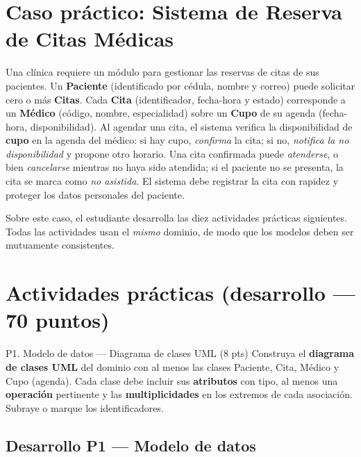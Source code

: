 \documentclass[11pt,a4paper,oneside]{article}
\begin{document}
\section{Caso pr\'actico: Sistema de Reserva de Citas M\'edicas}

Una cl\'inica requiere un m\'odulo para gestionar las reservas de citas de sus pacientes. Un \textbf{Paciente} (identificado por c\'edula, nombre y correo) puede solicitar cero o m\'as \textbf{Citas}. Cada \textbf{Cita} (identificador, fecha-hora y estado) corresponde a un \textbf{M\'edico} (c\'odigo, nombre, especialidad) sobre un \textbf{Cupo} de su agenda (fecha-hora, disponibilidad). Al agendar una cita, el sistema verifica la disponibilidad de \textbf{cupo} en la agenda del m\'edico: si hay cupo, \emph{confirma} la cita; si no, \emph{notifica la no disponibilidad} y propone otro horario. Una cita confirmada puede \emph{atenderse}, o bien \emph{cancelarse} mientras no haya sido atendida; si el paciente no se presenta, la cita se marca como \emph{no asistida}. El sistema debe registrar la cita con rapidez y proteger los datos personales del paciente.

Sobre este caso, el estudiante desarrolla las diez actividades pr\'acticas siguientes. Todas las actividades usan el \emph{mismo} dominio, de modo que los modelos deben ser mutuamente consistentes.

\section{Actividades pr\'acticas (desarrollo --- 70 puntos)}

\begin{tarea}{P1. Modelo de datos --- Diagrama de clases UML \hfill (8 pts)}
Construya el \textbf{diagrama de clases UML} del dominio con al menos las clases \textsf{Paciente}, \textsf{Cita}, \textsf{M\'edico} y \textsf{Cupo} (agenda). Cada clase debe incluir sus \textbf{atributos} con tipo, al menos una \textbf{operaci\'on} pertinente y las \textbf{multiplicidades} en los extremos de cada asociaci\'on. Subraye o marque los identificadores.
\end{tarea}


\subsection*{Desarrollo P1 --- Modelo de datos}
\end{document}
